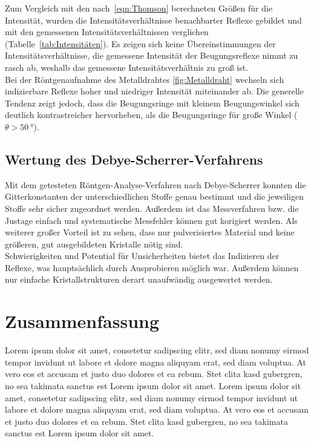 \documentclass[a4paper,twoside,final]{article}
\begin{document}
Zum Vergleich mit den nach~\eqref{eqn:Thomson} berechneten Größen für die Intensität, wurden die Intensitätsverhältnisse benachbarter Reflexe gebildet und mit den gemessenen Intensitätsverhältnissen verglichen (Tabelle~\ref{tab:Intensitäten}). Es zeigen sich keine Übereinstimmungen der Intensitätsverhältnisse, die gemessene Intensität der Beugungsreflexe nimmt zu rasch ab, weshalb das gemessene Intensitätsverhältnis zu groß ist.\\
Bei der Röntgenaufnahme des Metalldrahtes \ref{fig:Metalldraht} wechseln sich indizierbare Reflexe hoher und niedriger Intensität miteinander ab. Die generelle Tendenz zeigt jedoch, dass die Beugungsringe mit kleinem Beugungswinkel sich deutlich kontrastreicher hervorheben, als die Beugungsringe für große Winkel ($\theta > \SI{50}{\degree}$).

\subsection{Wertung des Debye-Scherrer-Verfahrens}
Mit dem getesteten Röntgen-Analyse-Verfahren nach Debye-Scherrer konnten die Gitterkonstanten der unterschiedlichen Stoffe genau bestimmt und die jeweiligen Stoffe sehr sicher zugeordnet werden. Außerdem ist das Messverfahren bzw. die Justage einfach und systematische Messfehler können gut korigiert werden. Als weiterer großer Vorteil ist zu sehen, dass nur pulverisiertes Material und keine größeren, gut ausgebildeten Kristalle nötig sind.\\
Schwierigkeiten und Potential für Unsicherheiten bietet das Indizieren der Reflexe, was hauptsächlich durch Ausprobieren möglich war. Außerdem können nur einfache Kristallstrukturen derart unaufwändig ausgewertet werden.


\section{Zusammenfassung}
Lorem ipsum dolor sit amet, consetetur sadipscing elitr, sed diam nonumy eirmod tempor invidunt ut labore et dolore magna aliquyam erat, sed diam voluptua. At vero eos et accusam et justo duo dolores et ea rebum. Stet clita kasd gubergren, no sea takimata sanctus est Lorem ipsum dolor sit amet. Lorem ipsum dolor sit amet, consetetur sadipscing elitr, sed diam nonumy eirmod tempor invidunt ut labore et dolore magna aliquyam erat, sed diam voluptua. At vero eos et accusam et justo duo dolores et ea rebum. Stet clita kasd gubergren, no sea takimata sanctus est Lorem ipsum dolor sit amet.
\end{document}
